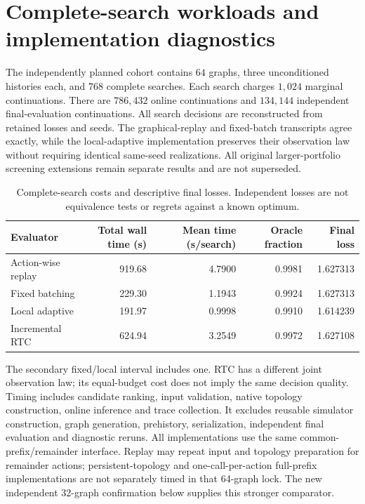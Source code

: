 \documentclass[preprint,11pt,sort&compress]{elsarticle}
\begin{document}
\FloatBarrier\section{Complete-search workloads and implementation diagnostics}
The independently planned cohort contains $64$ graphs, three unconditioned histories each, and $768$ complete searches. Each search charges $1,024$ marginal continuations. There are $786,432$ online continuations and $134,144$ independent final-evaluation continuations. All search decisions are reconstructed from retained losses and seeds. The graphical-replay and fixed-batch transcripts agree exactly, while the local-adaptive implementation preserves their observation law without requiring identical same-seed realizations. All original larger-portfolio screening extensions remain separate results and are not superseded.

\begin{table}[!htbp]
\centering\small
\caption{Complete-search costs and descriptive final losses. Independent losses are not equivalence tests or regrets against a known optimum.}
\begin{tabular}{lrrrr}
\toprule
Evaluator & Total wall time (s) & Mean time (s/search) & Oracle fraction & Final loss\\
\midrule
Action-wise replay & 919.68 & 4.7900 & 0.9981 & 1.627313 \\
Fixed batching & 229.30 & 1.1943 & 0.9924 & 1.627313 \\
Local adaptive & 191.97 & 0.9998 & 0.9910 & 1.614239 \\
Incremental RTC & 624.94 & 3.2549 & 0.9972 & 1.627108 \\
\bottomrule
\end{tabular}
\end{table}

The secondary fixed/local interval includes one. RTC has a different joint observation law; its equal-budget cost does not imply the same decision quality. Timing includes candidate ranking, input validation, native topology construction, online inference and trace collection. It excludes reusable simulator construction, graph generation, prehistory, serialization, independent final evaluation and diagnostic reruns. All implementations use the same common-prefix/remainder interface. Replay may repeat input and topology preparation for remainder actions; persistent-topology and one-call-per-action full-prefix implementations are not separately timed in that 64-graph lock. The new independent 32-graph confirmation below supplies this stronger comparator.
\end{document}
